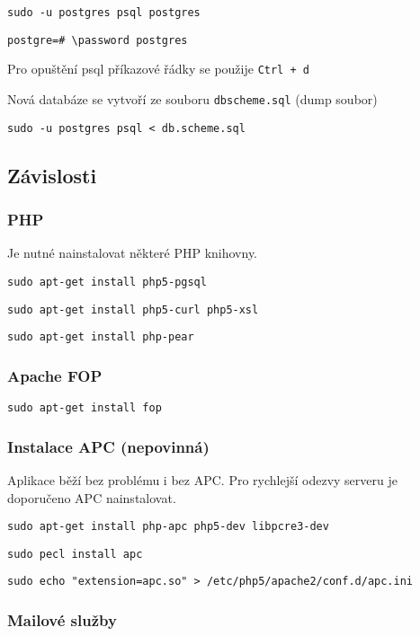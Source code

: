 \documentclass[12pt]{article}
\begin{document}
\texttt{sudo -u postgres psql postgres}

\texttt{postgre=\# \textbackslash password postgres}\newline

Pro opuštění psql příkazové řádky se použije \texttt{Ctrl + d}\newline

Nová databáze se vytvoří ze souboru \texttt{dbscheme.sql} (dump soubor)\newline

\texttt{sudo -u postgres psql < db.scheme.sql}\newline

\subsection{Závislosti}

\subsubsection{PHP}

Je nutné nainstalovat některé PHP knihovny.\newline

\texttt{sudo apt-get install php5-pgsql}

\texttt{sudo apt-get install php5-curl php5-xsl}

\texttt{sudo apt-get install php-pear}

\subsubsection{Apache FOP} 

\texttt{sudo apt-get install fop}

\subsubsection{Instalace APC (nepovinná)}\label{apc}

Aplikace běží bez problému i bez APC. Pro rychlejší odezvy serveru je doporučeno APC nainstalovat.\newline

\texttt{sudo apt-get install php-apc php5-dev libpcre3-dev}

\texttt{sudo pecl install apc}

\texttt{sudo echo "extension=apc.so" > /etc/php5/apache2/conf.d/apc.ini}

\subsubsection{Mailové služby}
\end{document}
